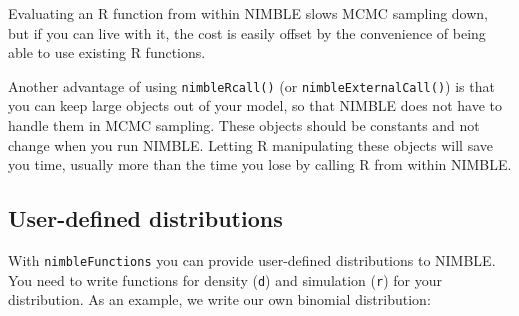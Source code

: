 \documentclass[
  12pt,
]{krantz}
\begin{document}
Evaluating an R function from within NIMBLE slows MCMC sampling down, but if you can live with it, the cost is easily offset by the convenience of being able to use existing R functions.

Another advantage of using \texttt{nimbleRcall()} (or \texttt{nimbleExternalCall()}) is that you can keep large objects out of your model, so that NIMBLE does not have to handle them in MCMC sampling. These objects should be constants and not change when you run NIMBLE. Letting R manipulating these objects will save you time, usually more than the time you lose by calling R from within NIMBLE.

\hypertarget{user-defined-distributions}{%
\subsection{User-defined distributions}\label{user-defined-distributions}}

With \texttt{nimbleFunctions} you can provide user-defined distributions to NIMBLE. You need to write functions for density (\texttt{d}) and simulation (\texttt{r}) for your distribution. As an example, we write our own binomial distribution:
\end{document}
